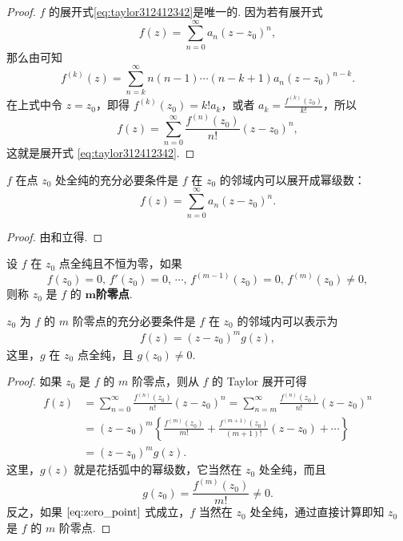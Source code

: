 \documentclass[../../main.tex]{subfiles}
\begin{document}
\begin{proof}
\( f \) 的展开式\eqref{eq:taylor312412342}是唯一的. 因为若有展开式
\[
f(z) = \sum_{n=0}^{\infty} a_n (z - z_0)^n,
\]
那么由可知
\[
f^{(k)}(z) = \sum_{n=k}^{\infty} n(n - 1) \cdots (n - k + 1) a_n (z - z_0)^{n - k}.
\]
在上式中令 \( z = z_0 \)，即得 \( f^{(k)}(z_0) = k! a_k \)，或者 \( a_k = \frac{f^{(k)}(z_0)}{k!} \)，所以
\[
f(z) = \sum_{n=0}^{\infty} \frac{f^{(n)}(z_0)}{n!} (z - z_0)^n,
\]
这就是展开式 \eqref{eq:taylor312412342}.
\end{proof}

\begin{theorem}\label{theorem:定理4.3.2}
\( f \) 在点 \( z_0 \) 处全纯的充分必要条件是 \( f \) 在 \( z_0 \) 的邻域内可以展开成幂级数：
\[
f(z) = \sum_{n=0}^{\infty} a_n (z - z_0)^n.
\]
\end{theorem}
\begin{proof}
由和立得.
\end{proof}

\begin{definition}
设 \( f \) 在 \( z_0 \) 点全纯且不恒为零，如果
\[
f(z_0) = 0, \, f'(z_0) = 0, \, \cdots, \, f^{(m - 1)}(z_0) = 0, \, f^{(m)}(z_0) \neq 0,
\]
则称 \( z_0 \) 是 \( f \) 的 $\boldsymbol{m}$\textbf{阶零点}.
\end{definition}

\begin{proposition}\label{proposition:命题4.3.4}
\( z_0 \) 为 \( f \) 的 \( m \) 阶零点的充分必要条件是 \( f \) 在 \( z_0 \) 的邻域内可以表示为
\begin{align}
f(z) = (z - z_0)^m g(z), \label{eq:zero_point}
\end{align}
这里，\( g \) 在 \( z_0 \) 点全纯，且 \( g(z_0) \neq 0 \).
\end{proposition}
\begin{proof}
如果 \( z_0 \) 是 \( f \) 的 \( m \) 阶零点，则从 \( f \) 的 Taylor 展开可得
\begin{align*}
f(z) &= \sum_{n=0}^{\infty} \frac{f^{(n)}(z_0)}{n!} (z - z_0)^n = \sum_{n=m}^{\infty} \frac{f^{(n)}(z_0)}{n!} (z - z_0)^n \\
&= (z - z_0)^m \left\{ \frac{f^{(m)}(z_0)}{m!} + \frac{f^{(m + 1)}(z_0)}{(m + 1)!} (z - z_0) + \cdots \right\} \\
&= (z - z_0)^m g(z).
\end{align*}
这里，\( g(z) \) 就是花括弧中的幂级数，它当然在 \( z_0 \) 处全纯，而且
\[
g(z_0) = \frac{f^{(m)}(z_0)}{m!} \neq 0.
\]
反之，如果 \(\eqref{eq:zero_point}\) 式成立，\( f \) 当然在 \( z_0 \) 处全纯，通过直接计算即知 \( z_0 \) 是 \( f \) 的 \( m \) 阶零点.
\end{proof}
\end{document}
